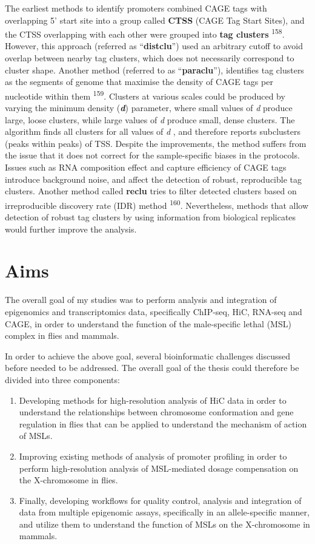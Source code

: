 \documentclass[11pt,twoside]{MPIthesis}
\theoremstyle{definition}
\theoremstyle{definition}
\theoremstyle{definition}
\theoremstyle{remark}
\begin{document}
The earliest methods to identify promoters combined CAGE tags with
overlapping 5' start site into a group called \textbf{CTSS} (CAGE Tag
Start Sites), and the CTSS overlapping with each other were grouped into
\textbf{tag clusters} \textsuperscript{158}. However, this approach
(referred as ``\textbf{distclu}'') used an arbitrary cutoff to avoid
overlap between nearby tag clusters, which does not necessarily
correspond to cluster shape. Another method (referred to as
``\textbf{paraclu}''), identifies tag clusters as the segments of genome
that maximise the density of CAGE tags per nucleotide within them
\textsuperscript{159}. Clusters at various scales could be produced by
varying the minimum density (\textbf{\emph{d}}) parameter, where small
values of \emph{d} produce large, loose clusters, while large values of
\emph{d} produce small, dense clusters. The algorithm finds all clusters
for all values of \emph{d} , and therefore reports subclusters (peaks
within peaks) of TSS. Despite the improvements, the method suffers from
the issue that it does not correct for the sample-specific biases in the
protocols. Issues such as RNA composition effect and capture efficiency
of CAGE tags introduce background noise, and affect the detection of
robust, reproducible tag clusters. Another method called \textbf{reclu}
tries to filter detected clusters based on irreproducible discovery rate
(IDR) method \textsuperscript{160}. Nevertheless, methods that allow
detection of robust tag clusters by using information from biological
replicates would further improve the analysis.

\section{Aims}\label{aims}

The overall goal of my studies was to perform analysis and integration
of epigenomics and transcriptomics data, specifically ChIP-seq, HiC,
RNA-seq and CAGE, in order to understand the function of the
male-specific lethal (MSL) complex in flies and mammals.

In order to achieve the above goal, several bioinformatic challenges
discussed before needed to be addressed. The overall goal of the thesis
could therefore be divided into three components:
\begin{enumerate}
\def\labelenumi{\arabic{enumi}.}
\item
  Developing methods for high-resolution analysis of HiC data in order
  to understand the relationships between chromosome conformation and
  gene regulation in flies that can be applied to understand the
  mechanism of action of MSLs.
\item
  Improving existing methods of analysis of promoter profiling in order
  to perform high-resolution analysis of MSL-mediated dosage
  compensation on the X-chromosome in flies.
\item
  Finally, developing workflows for quality control, analysis and
  integration of data from multiple epigenomic assays, specifically in
  an allele-specific manner, and utilize them to understand the function
  of MSLs on the X-chromosome in mammals.
\end{enumerate}
\end{document}
